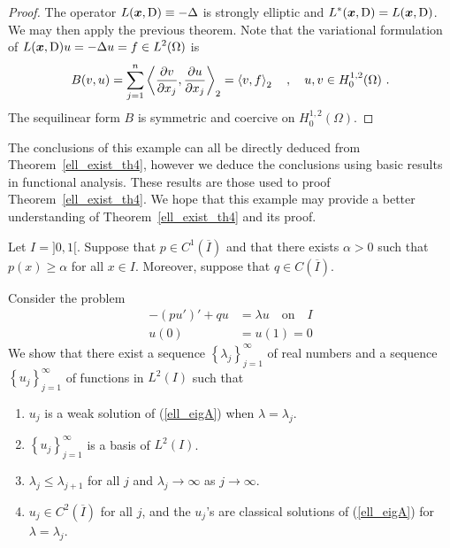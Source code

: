 \begin{proof}
The operator $L({\bm{x}},\operatorname{D}) \equiv - \Delta$ is strongly elliptic
and $\displaystyle L^\ast({\bm{x}},\operatorname{D}) = L({\bm{x}},\operatorname{D})$.  We may
then apply the previous theorem.  Note that the variational formulation of
$\displaystyle L({\bm{x}},\operatorname{D})u = - \Delta u = f \in L^2(\Omega)$ is
\[
B(v,u) = \sum_{j=1}^n \left\langle{\frac{\partial{v}}{\partial x_j}} , {\frac{\partial{u}}{\partial x_j}}\right\rangle_2 = \left\langle{v} , {f}\right\rangle_2 \quad,
\quad u, v \in H^{1,2}_0(\Omega) \ .
\]
The sequilinear form $B$ is symmetric and coercive on
$\displaystyle H^{1,2}_0(\Omega)$.  
\end{proof}

\begin{egg}
The conclusions of this example can all be directly deduced from
Theorem~\ref{ell_exist_th4}, however we deduce the conclusions using
basic results in functional analysis.  These results are those used
to proof Theorem~\ref{ell_exist_th4}.  We hope that this example may
provide a better understanding of Theorem~\ref{ell_exist_th4} and its
proof.

Let $I = ]0,1[$.  Suppose that $\displaystyle p \in C^1(\overline{I})$ and that
there exists $\alpha>0$ such that $p(x) \geq \alpha$ for all
$x \in I$.  Moreover, suppose that $q \in C(\overline{I})$.

Consider the problem
\begin{equation} \label{ell_eigA}
\begin{split}
-(p u')' + q u &= \lambda u \quad \text{on} \quad I \\
u(0) &= u(1) = 0
\end{split}
\end{equation}
We show that there exist a sequence
$\displaystyle \left\{\lambda_j\right\}_{j=1}^\infty$ of real
numbers and a sequence $\displaystyle \left\{u_j\right\}_{j=1}^\infty$
of functions in $\displaystyle L^2(I)$ such that
\begin{enumerate}
\item $u_j$ is a weak solution of (\ref{ell_eigA}) when
$\lambda = \lambda_j$.
\item $\displaystyle \left\{u_j\right\}_{j=1}^\infty$ is a basis of
$\displaystyle L^2(I)$.
\item $\lambda_j \leq \lambda_{j+1}$ for all $j$ and
$\lambda_j \to \infty$ as $j \to \infty$.
\item $\displaystyle u_j \in C^2(\overline{I})$ for all $j$,
and the $u_j$'s are
classical solutions of (\ref{ell_eigA}) for $\lambda = \lambda_j$.
\end{enumerate}


\end{egg}
